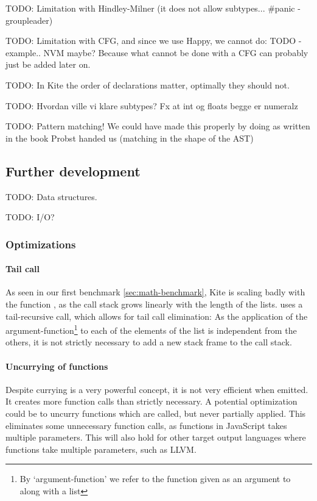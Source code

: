 TODO: Limitation with Hindley-Milner (it does not allow subtypes... \#panic - groupleader)

TODO: Limitation with CFG, and since we use Happy, we cannot do: TODO - example.. NVM maybe? Because what cannot be done with a CFG can probably just be added later on.

TODO: In Kite the order of declarations matter, optimally they should not.

TODO: Hvordan ville vi klare subtypes? Fx at int og floats begge er numeralz

TODO: Pattern matching! We could have made this properly by doing as written in the book Probst handed us (matching in the shape of the AST)


\subsection{Further development}

TODO: Data structures.

TODO: I/O?
\subsubsection{Optimizations}
\label{sec:disc-optimization}

\paragraph{Tail call}
As seen in our first benchmark \ref{sec:math-benchmark}, Kite is scaling badly with the function , as the call stack grows linearly with the length of the lists.  uses a tail-recursive call, which allows for tail call elimination: As the application of the argument-function\footnote{By `argument-function' we refer to the function given as an argument to  along with a list} to each of the elements of the list is independent from the others, it is not strictly necessary to add a new stack frame to the call stack.

\paragraph{Uncurrying of functions} Despite currying is a very powerful concept, it is not very efficient when emitted. It creates more function calls than strictly necessary. A potential optimization could be to uncurry functions which are called, but never partially applied. This eliminates some unnecessary function calls, as functions in JavaScript takes multiple parameters. This will also hold for other target output languages where functions take multiple parameters, such as LLVM.

